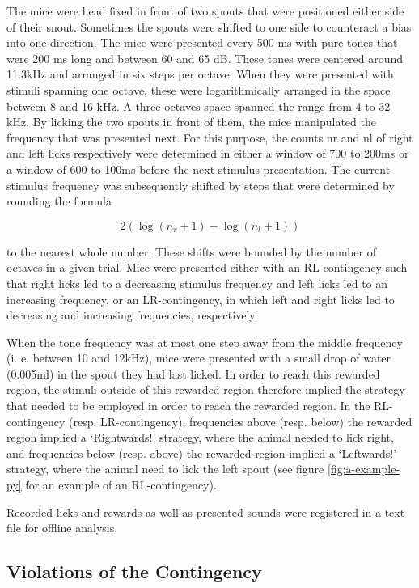 \documentclass[]{report}
\theoremstyle{definition}
\theoremstyle{definition}
\theoremstyle{definition}
\theoremstyle{remark}
\begin{document}
The mice were head fixed in front of two spouts that were positioned
either side of their snout. Sometimes the spouts were shifted to one
side to counteract a bias into one direction. The mice were presented
every 500 ms with pure tones that were 200 ms long and between 60 and 65
dB. These tones were centered around 11.3kHz and arranged in six steps
per octave. When they were presented with stimuli spanning one octave,
these were logarithmically arranged in the space between 8 and 16 kHz. A
three octaves space spanned the range from 4 to 32 kHz. By licking the
two spouts in front of them, the mice manipulated the frequency that was
presented next. For this purpose, the counts nr and nl of right and left
licks respectively were determined in either a window of 700 to 200ms or
a window of 600 to 100ms before the next stimulus presentation. The
current stimulus frequency was subsequently shifted by steps that were
determined by rounding the formula

\[2\left(\log(n_r+1)-\log(n_l+1)\right)\]

to the nearest whole number. These shifts were bounded by the number of
octaves in a given trial. Mice were presented either with an
RL-contingency such that right licks led to a decreasing stimulus
frequency and left licks led to an increasing frequency, or an
LR-contingency, in which left and right licks led to decreasing and
increasing frequencies, respectively.

When the tone frequency was at most one step away from the middle
frequency (i. e. between 10 and 12kHz), mice were presented with a small
drop of water (0.005ml) in the spout they had last licked. In order to
reach this rewarded region, the stimuli outside of this rewarded region
therefore implied the strategy that needed to be employed in order to
reach the rewarded region. In the RL-contingency (resp. LR-contingency),
frequencies above (resp. below) the rewarded region implied a
`Rightwards!' strategy, where the animal needed to lick right, and
frequencies below (resp. above) the rewarded region implied a
`Leftwards!' strategy, where the animal need to lick the left spout (see
figure \ref{fig:a-example-py} for an example of an RL-contingency).

Recorded licks and rewards as well as presented sounds were registered
in a text file for offline analysis.

\hypertarget{violations-of-the-contingency}{%
\subsection{Violations of the
Contingency}\label{violations-of-the-contingency}}
\end{document}
